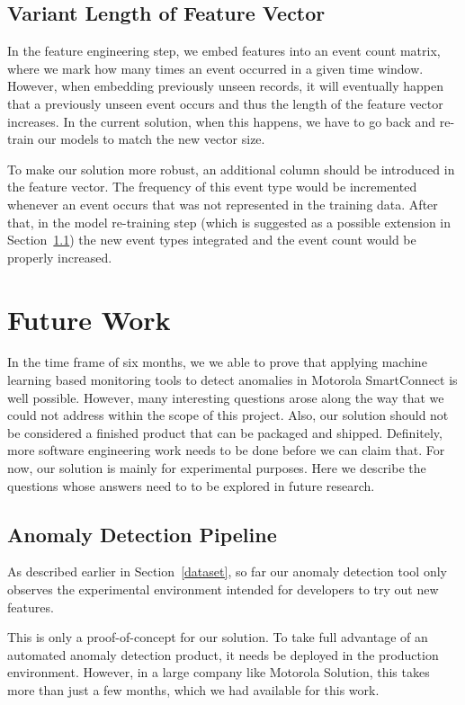 \subsection{Variant Length of Feature Vector}
In the feature engineering step, we embed features into an event count matrix, where we mark how many times an event occurred in a given time window. However, when embedding previously unseen records, it will eventually happen that a previously unseen event occurs and thus the length of the feature vector increases. In the current solution, when this happens, we have to go back and re-train our models to match the new vector size. 

To make our solution more robust, an additional column should be introduced in the feature vector. The frequency of this event type would be incremented whenever an event occurs that was not represented in the training data. 
After that, in the model re-training step (which is suggested as a possible extension in Section~\ref{future:pipeline}) the new event types integrated and the event count would be properly increased.

\section{Future Work}
In the time frame of six months, we we able to prove that applying machine learning based monitoring tools to detect anomalies in Motorola SmartConnect is well possible.
However, many interesting questions arose along the way that we could not address within the scope of this project.
Also, our solution should not be considered a finished product that can be packaged and shipped. Definitely, more software engineering work needs to be done before we can claim that. For now, our solution is mainly for experimental purposes.
Here we describe the questions whose answers need to to be explored in future research.

\subsection{Anomaly Detection Pipeline}
\label{future:pipeline}
As described earlier in Section~\ref{dataset}, so far our anomaly detection tool only observes the experimental environment intended for developers to try out new features. 

This is only a proof-of-concept for our solution. To take full advantage of an automated anomaly detection product, it needs be deployed in the production environment. However, in a large company like Motorola Solution, this takes more than just a few months, which we had available for this work.

